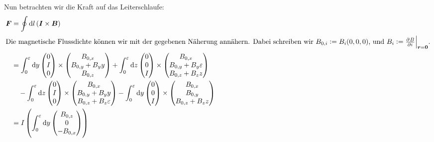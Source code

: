 \documentclass[11pt, ngerman, fleqn]{article}
\renewcommand{\vec}[1]{\boldsymbol{#1}}
\begin{document}
Nun betrachten wir die Kraft auf das Leiterschlaufe:
\begin{align*}
	\vec F
	&= \oint \dif l \del{\vec I \times \vec B} \\
	\intertext{Die magnetische Flussdichte können wir mit der gegebenen Näherung annähern. Dabei schreiben wir $B_{0,i} := B_i(0, 0, 0)$, und $B_i := \eval[2]{\pd Bi}_{\vec r = \vec 0}$.}
	&=
	\int_0^\varepsilon \dif y
	\begin{pmatrix}
		0 \\ I \\ 0
	\end{pmatrix}
	\times
	\begin{pmatrix}
		B_{0,x} \\ B_{0,y} + B_y y \\ B_{0,z}
	\end{pmatrix}
	+
	\int_0^\varepsilon \dif z
	\begin{pmatrix}
		0 \\ 0 \\ I
	\end{pmatrix}
	\times
	\begin{pmatrix}
		B_{0,x} \\ B_{0,y} + B_y \varepsilon \\ B_{0,z} + B_z z
	\end{pmatrix} \\
	&\quad
	-
	\int_0^\varepsilon \dif z
	\begin{pmatrix}
		0 \\ I \\ 0
	\end{pmatrix}
	\times
	\begin{pmatrix}
		B_{0,x} \\ B_{0,y} + B_y y \\ B_{0,z} + B_z \varepsilon
	\end{pmatrix}
	-
	\int_0^\varepsilon \dif y
	\begin{pmatrix}
		0 \\ 0 \\ I
	\end{pmatrix}
	\times
	\begin{pmatrix}
		B_{0,x} \\ B_{0,y} \\ B_{0,z} + B_z z
	\end{pmatrix} \\
	&=
	I \del{
	\int_0^\varepsilon \dif y
	\begin{pmatrix}
		B_{0,z} \\ 0 \\ - B_{0,x}

\end{pmatrix}}
\end{align*}
\end{document}
